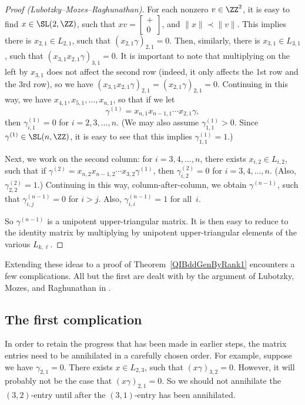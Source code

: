 \begin{proof}[Proof \normalfont (Lubotzky--Mozes--Raghunathan)]
For each nonzero $v \in \ZZ^2$, it is easy to find $x \in \SL(2,\ZZ)$, such that $xv = \left[\begin{smallmatrix} + \\ 0 \end{smallmatrix}\right]$, and $\| x \| \prec \| v \|$.
	This implies there is $x_{2,1} \in L_{2,1}$, such that $(x_{2,1} \gamma)_{2,1} = 0$.
	Then, similarly, there is $x_{3,1} \in L_{3,1}$, such that $(x_{3,1} x_{2,1} \gamma)_{3,1} = 0$. It is important to note that multiplying on the left by $x_{3,1}$ does not affect the second row (indeed, it only affects the 1st row and the 3rd row), so we have $(x_{3,1} x_{2,1} \gamma)_{2,1} = (x_{2,1} \gamma)_{2,1} = 0$. Continuing in this way, we have $x_{4,1}, x_{5,1}, \ldots, x_{n,1}$, so that if we let
\[\gamma^{(1)} = x_{n,1} x_{n-1,1} \cdots x_{2,1} \gamma ,\]
then $\gamma^{(1)}_{i,1} = 0$ for $i = 2,3,\ldots, n$.
(We may also assume $\gamma^{(1)}_{1,1} > 0$. Since $\gamma^{(1)} \in \SL(n, \ZZ)$, it is easy to see that this implies $\gamma^{(1)}_{1,1} = 1$.)

Next, we work on the second column: for $i = 3,4, \ldots, n$, there exists $x_{i,2} \in L_{i,2}$, such that if $\gamma^{(2)} = x_{n,2} x_{n-1,2} \cdots x_{3,2} \gamma^{(1)}$, then $\gamma^{(2)}_{i,2} = 0$ for $i = 3,4,\ldots,n$. (Also, $\gamma^{(2)}_{2,2} = 1$.)
Continuing in this way, column-after-column, we obtain $\gamma^{(n-1)}$, such that $\gamma^{(n-1)}_{i,j} = 0$ for $i > j$. Also, $\gamma^{(n-1)}_{i,i} =1$ for all~$i$.

So $\gamma^{(n-1)}$ is a unipotent upper-triangular matrix. It is then easy to reduce to the identity matrix by multiplying by unipotent upper-triangular elements of the various $L_{k,\ell}$.
\end{proof}

Extending these ideas to a proof of Theorem~\ref{QIBddGenByRank1} encounters a few complications. All but the first are dealt with by the argument of Lubotzky, Mozes, and Raghunathan in \cite[Section~4]{MR1828742}.

\subsection*{The first complication}
In order to retain the progress that has been made in earlier steps, the matrix entries need to be annihilated in a carefully chosen order.
For example, suppose we have $\gamma_{2,1} = 0$. There exists $x \in L_{2,3}$, such that $(x \gamma)_{3,2} = 0$. However, it will probably not be the case that $(x \gamma)_{2,1} = 0$. So we should not annihilate the $(3,2)$-entry until after the $(3,1)$-entry has been annihilated.

